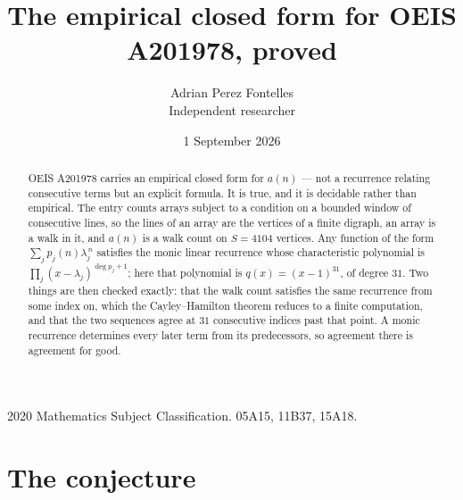 \documentclass[11pt,a4paper]{article}
\title{The empirical closed form for OEIS A201978, proved}
\author{Adrian Perez Fontelles\\ \small Independent researcher}
\date{1 September 2026}
\theoremstyle{plain}
\theoremstyle{definition}
\begin{document}
\maketitle

\begin{abstract}
OEIS A201978 carries an empirical closed form for $a(n)$ --- not a recurrence relating
consecutive terms but an explicit formula. It is true, and it is decidable rather than
empirical. The entry counts arrays subject to a condition on a bounded window of consecutive lines, so the lines of an array are the
vertices of a finite digraph, an array is a walk in it, and $a(n)$ is a walk count on
$S=4104$ vertices. Any function of the form $\sum_j p_j(n)\lambda_j^{\,n}$ satisfies the
monic linear recurrence whose characteristic polynomial is
$\prod_j(x-\lambda_j)^{\deg p_j+1}$; here that polynomial is $q(x)=(x-1)^{31}$, of degree
$31$. Two things are then checked exactly: that the walk count satisfies the same
recurrence from some index on, which the Cayley--Hamilton theorem reduces to a finite
computation, and that the two sequences agree at $31$ consecutive indices past that
point. A monic recurrence determines every later term from its predecessors, so agreement
there is agreement for good.
\end{abstract}

\noindent\small 2020 Mathematics Subject Classification. 05A15, 11B37, 15A18.\normalsize

\section{The conjecture}
\end{document}
